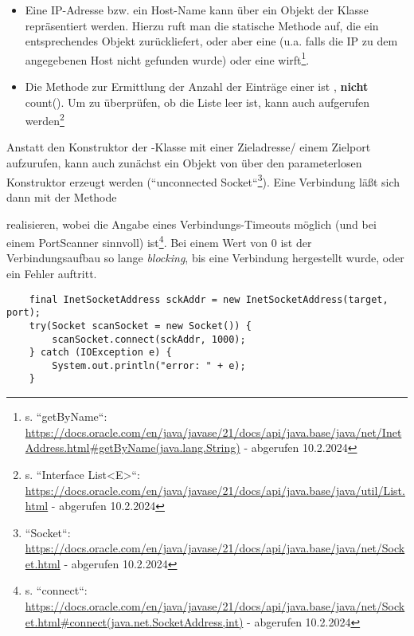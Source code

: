 \begin{itemize}
    \item Eine IP-Adresse bzw. ein Host-Name kann über ein Objekt der Klasse  repräsentiert werden.
    Hierzu ruft man die statische Methode  auf, die ein entsprechendes Objekt zurückliefert,
    oder aber eine  (u.a. falls die IP zu dem angegebenen Host nicht gefunden wurde) oder eine  wirft\footnote{
    s. ``getByName``: \url{https://docs.oracle.com/en/java/javase/21/docs/api/java.base/java/net/InetAddress.html#getByName(java.lang.String)} - abgerufen 10.2.2024
    }.
    \item Die Methode zur Ermittlung der Anzahl der Einträge einer  ist , \textbf{nicht} count().
    Um zu überprüfen, ob die Liste leer ist, kann auch  aufgerufen werden\footnote{
    s. ``Interface List<E>``: \url{https://docs.oracle.com/en/java/javase/21/docs/api/java.base/java/util/List.html} - abgerufen 10.2.2024
    }
    \end{itemize}

\noindent
Anstatt den Konstruktor der -Klasse mit einer Zieladresse/ einem Zielport aufzurufen, kann auch zunächst ein Objekt von  über den parameterlosen Konstruktor erzeugt werden (``unconnected Socket``\footnote {
    ``Socket``: \url{https://docs.oracle.com/en/java/javase/21/docs/api/java.base/java/net/Socket.html} - abgerufen 10.2.2024
}).
Eine Verbindung läßt sich dann mit der Methode \begin{center}\end{center} realisieren, wobei die Angabe eines Verbindungs-Timeouts möglich (und bei einem PortScanner sinnvoll) ist\footnote{
    s. ``connect``: \url{https://docs.oracle.com/en/java/javase/21/docs/api/java.base/java/net/Socket.html#connect(java.net.SocketAddress,int)} - abgerufen 10.2.2024
}.
Bei einem Wert von $0$ ist der Verbindungsaufbau so lange \textit{blocking}, bis eine Verbindung hergestellt wurde, oder ein Fehler auftritt.

\begin{verbatim}
    final InetSocketAddress sckAddr = new InetSocketAddress(target, port);
    try(Socket scanSocket = new Socket()) {
        scanSocket.connect(sckAddr, 1000);
    } catch (IOException e) {
        System.out.println("error: " + e);
    }
\end{verbatim}

